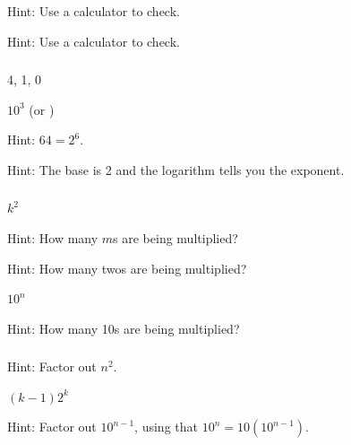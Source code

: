 \subsubsection*{ \answers}
\begin{apart}
    \item Hint: Use a calculator to check.
    \item {}
    \item Hint: Use a calculator to check.
\end{apart}

\subsubsection*{ \answers}
\begin{apart}
    \item 4, 1, 0
    \item $10^3$ (or )
    \item Hint: $64=2^6$.
    \item Hint: The base is 2 and the logarithm tells you the exponent.
\end{apart}

\subsubsection*{ \answers}
\begin{apart}
    \item $k^2$
    \item Hint: How many $m$s are being multiplied?
    \item Hint: How many twos are being multiplied?
    \item $10^n$
    \item Hint: How many 10s are being multiplied?
\end{apart}

\subsubsection*{ \answers}
\begin{apart}
    \item Hint: Factor out $n^2$.
    \item $(k-1)2^k$
    \item Hint: Factor out $10^{n-1}$, using that $10^n=10(10^{n-1})$.
\end{apart}

